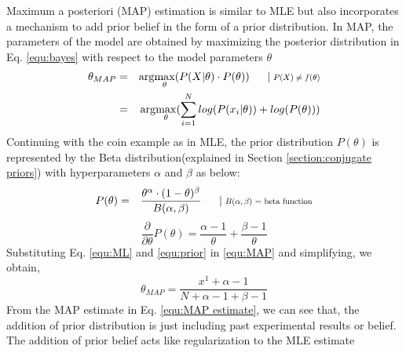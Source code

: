 Maximum a posteriori (MAP) estimation is similar to MLE but also incorporates a mechanism to add prior belief in the form of a prior distribution. In MAP, the parameters of the model are obtained by maximizing the posterior distribution in Eq. \ref{equ:bayes} with respect to the model parameters $\theta$
\begin{eqnarray}
\theta_{MAP} & = & \arg\!\max_\theta(P(X|\theta) \cdot P(\theta)) \ \ \ \ \mid \scalebox{0.75}{$ P(X) \neq f(\theta)$} \\
& = & \arg\!\max_\theta(\sum_{i=1}^{N}log(P(x_{i}|\theta)) + log(P(\theta)))
\label{equ:MAP}
\end{eqnarray}
Continuing with the coin example as in MLE, the prior distribution $P(\theta)$ is represented by the Beta distribution(explained in Section \ref{section:conjugate priors}) with hyperparameters $\alpha$ and $\beta$ as below:
\begin{eqnarray}
P(\theta) & = & \frac{\theta^{\alpha}\cdot(1-\theta)^{\beta}}{B(\alpha,\beta)} \ \ \ \ \mid \scalebox{0.75}{$B(\alpha,\beta)$ = beta function}
\end{eqnarray}
\begin{equation}
\label{equ:prior}
\frac{\partial}{\partial\theta}P(\theta) = \frac{\alpha-1}{\theta} + \frac{\beta-1}{\theta}
\end{equation}
Substituting Eq. \ref{equ:ML} and \ref{equ:prior} in \ref{equ:MAP} and simplifying, we obtain,
\begin{equation}
\label{equ:MAP estimate}
\theta_{MAP} = \frac{x^{1}+\alpha-1}{N+\alpha-1+\beta-1}
\end{equation}
From the MAP estimate in Eq. \ref{equ:MAP estimate}, we can see that, the addition of prior distribution is just including past experimental results or belief.
The addition of prior belief acts like regularization to the MLE estimate